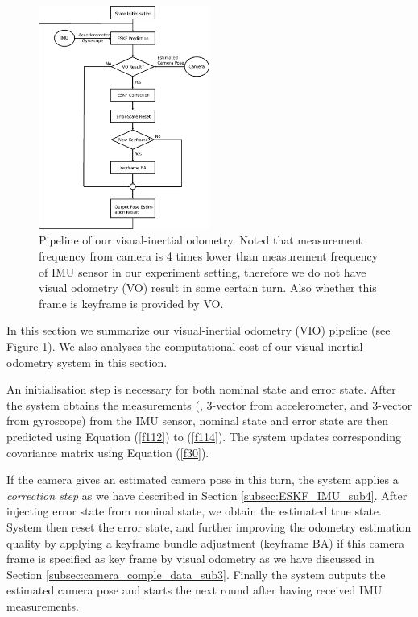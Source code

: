\begin{figure}[b]
    \centering
    \includegraphics[width=0.5\textwidth]{CONTENT/Figure/Figure4-1_Pipeline.png}
    \caption{Pipeline of our visual-inertial odometry. Noted that measurement frequency from camera is 4 times lower than measurement frequency of IMU sensor in our experiment setting, therefore we do not have visual odometry (VO) result in some certain turn. Also whether this frame is keyframe is provided by VO.}
    \label{fig:fig4-1}
\end{figure}


In this section we summarize our visual-inertial odometry (VIO) pipeline (see Figure \ref{fig:fig4-1}). We also analyses the computational cost of our visual inertial odometry system in this section.

An initialisation step is necessary for both nominal state and error state. After the system obtains the measurements (\eg, 3-vector from accelerometer, and 3-vector from gyroscope) from the IMU sensor, nominal state and error state are then predicted using Equation (\ref{f112}) to (\ref{f114}). The system updates corresponding covariance matrix using Equation (\ref{f30}). 

If the camera gives an estimated camera pose in this turn, the system applies a \textit{correction step} as we have described in Section \ref{subsec:ESKF_IMU_sub4}. After injecting error state from nominal state, we obtain the estimated true state. System then reset the error state, and further improving the odometry estimation quality by applying a keyframe bundle adjustment (keyframe BA) if this camera frame is specified as key frame by visual odometry as we have discussed in Section \ref{subsec:camera_comple_data_sub3}. Finally the system outputs the estimated camera pose and starts the next round after having received IMU measurements.

